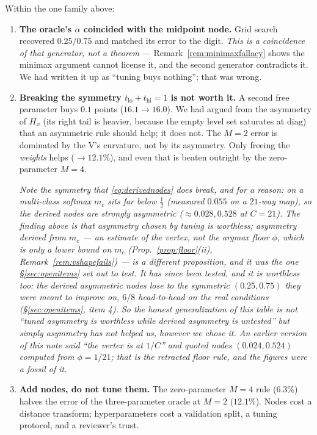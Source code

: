 \documentclass[11pt]{article}
\theoremstyle{remark}
\newcommand{\diag}{\mathrm{diag}}
\begin{document}
Within the one family above:
\begin{enumerate}
\item \textbf{The oracle's $\alpha$ coincided with the midpoint node.} Grid search
recovered $0.25/0.75$ and matched its error to the digit. \emph{This is a coincidence
of that generator, not a theorem} --- Remark~\ref{rem:minimaxfallacy} shows the minimax
argument cannot license it, and the second generator contradicts it. We had written it
up as ``tuning buys nothing''; that was wrong.
\item \textbf{Breaking the symmetry $t_{\mathrm{lo}}+t_{\mathrm{hi}}=1$ is not worth
it.} A second free parameter buys $0.1$ points ($16.1\to16.0$). We had argued from the
asymmetry of $H_x$ (its right tail is heavier, because the empty level set saturates
at $\diag$) that an asymmetric rule should help; it does not. The $M=2$ error is
dominated by the V's curvature, not by its asymmetry. Only freeing the \emph{weights}
helps ($\to 12.1\%$), and even that is beaten outright by the zero-parameter $M=4$.

\emph{Note the symmetry that \eqref{eq:derivednodes} \emph{does} break, and for a
reason: on a multi-class softmax $m_c$ sits far below $\tfrac12$ (measured $0.055$ on a
$21$-way map), so the derived nodes are strongly asymmetric ($\approx 0.028, 0.528$ at
$C=21$). The finding above is that asymmetry chosen by \emph{tuning} is worthless;
asymmetry \emph{derived from $m_c$} --- an \emph{estimate} of the vertex, not the argmax
floor $\phi$, which is only a lower bound on $m_c$ (Prop.~\ref{prop:floor}(ii),
Remark~\ref{rem:vshapefails}) --- is a different proposition, and it was the one
\S\ref{sec:openitems} set out to test. \emph{It has since been tested, and it is worthless
too}: the derived asymmetric nodes lose to the symmetric $(0.25,0.75)$ they were meant to
improve on, $6/8$ head-to-head on the real conditions (\S\ref{sec:openitems}, item 4). So
the honest generalization of this table is not ``tuned asymmetry is worthless while
derived asymmetry is untested'' but simply \emph{asymmetry has not helped us, however we
chose it}. An earlier version of this note said ``the vertex is at
$1/C$'' and quoted nodes $(0.024, 0.524)$ computed from $\phi = 1/21$; that is the
retracted floor rule, and the figures were a fossil of it.}
\item \textbf{Add nodes, do not tune them.} The zero-parameter $M=4$ rule ($6.3\%$)
halves the error of the three-parameter oracle at $M=2$ ($12.1\%$). Nodes cost a
distance transform; hyperparameters cost a validation split, a tuning protocol, and a
reviewer's trust.
\end{enumerate}
\end{document}
